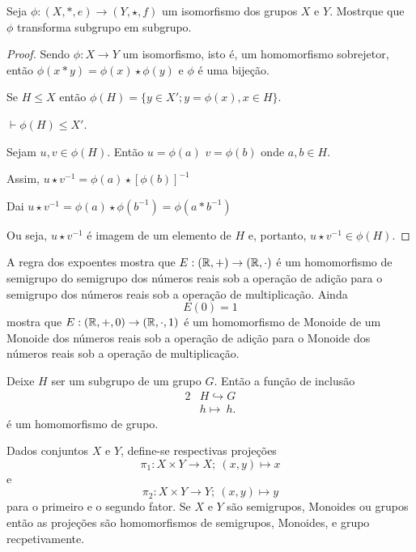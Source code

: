 \begin{exmp}
  Seja $\phi:(X, *, e) \to (Y, \star, f)$ um isomorfismo dos grupos $X$ e $Y$. Mostrque que $\phi$ transforma subgrupo em subgrupo.
  \begin{proof}
    Sendo $\phi: X \to Y$ um isomorfismo, isto é, um homomorfismo sobrejetor, então $\phi(x*y) = \phi(x) \star \phi(y)$ e $\phi$ é uma bijeção.

    Se $H \leq X$ então $\phi(H) = \{y \in X'; y = \phi(x), x\in H\}$.

    \quad $\vdash \phi(H) \leq X'$.

    Sejam $u,v \in \phi(H)$. Então $u = \phi(a)$ $v = \phi(b)$ onde $a,b \in H$.

    Assim, $u \star v^{-1} = \phi(a) \star [\phi(b)]^{-1}$

    Dai $u \star v^{-1} = \phi(a) \star \phi(b^{-1}) = \phi(a * b^{-1})$

    Ou seja, $u \star v^{-1}$ é imagem de um elemento de $H$ e, portanto, $u \star v^{-1} \in \phi(H)$.
  \end{proof}
\end{exmp}

\begin{exmp}
  A regra dos expoentes mostra que $E: (\mathbb{R}, +) \to (\mathbb{R},\cdot)$ é um homomorfismo de semigrupo do semigrupo dos números reais sob a operação de adição para o semigrupo dos números reais sob a operação de multiplicação. Ainda $$E(0)=1$$ mostra que $E: (\mathbb{R},+,0) \to (\mathbb{R},\cdot,1)$ é um homomorfismo de Monoide de um Monoide dos números reais sob a operação de adição para o Monoide dos números reais sob a operação de multiplicação.
\end{exmp}
\begin{exmp}
  Deixe $H$ ser um subgrupo de um grupo $G$. Então a função de inclusão
  \begin{alignat}{2}
    &H \hookrightarrow G \nonumber\\
    &h \mapsto\ h.
    \nonumber
  \end{alignat}
  é um homomorfismo de grupo.
\end{exmp}
\begin{exmp}
  Dados conjuntos $X$ e $Y$, define-se respectivas projeções
  $$\pi_{1}: X\times Y \to X;\ (x,y)\mapsto x$$ e $$\pi_{2}: X\times Y \to Y;\ (x,y)\mapsto y$$
  para o primeiro e o segundo fator. Se $X$ e $Y$ são semigrupos, Monoides ou grupos então as projeções são homomorfismos de semigrupos, Monoides, e grupo recpetivamente.
\end{exmp}


